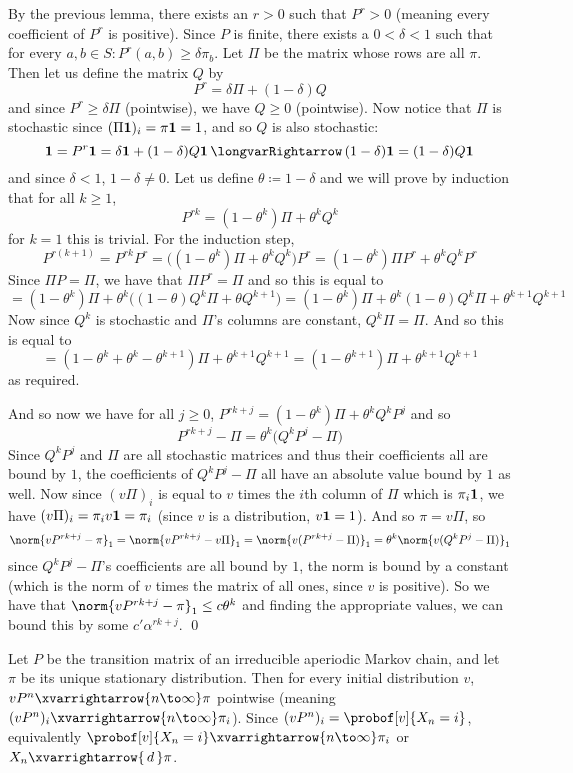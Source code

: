 \elemm

By the previous lemma, there exists an $r>0$ such that $P^r>0$ (meaning every coefficient of $P^r$ is positive).
Since $P$ is finite, there exists a $0<\delta<1$ such that for every $a,b\in S\colon P^r(a,b)\geq\delta\pi_b$.
Let $\Pi$ be the matrix whose rows are all $\pi$.
Then let us define the matrix $Q$ by
$$ P^r = \delta\Pi + (1-\delta)Q $$
and since $P^r\geq\delta\Pi$ (pointwise), we have $Q\geq0$ (pointwise).
Now notice that $\Pi$ is stochastic since $(\Pi{\bf1})_i=\pi{\bf1}=1$, and so $Q$ is also stochastic:
$$ {\bf1} = P^r{\bf1} = \delta{\bf1} + (1-\delta)Q{\bf1} \implies (1-\delta){\bf1} = (1-\delta)Q{\bf1} $$
and since $\delta<1$, $1-\delta\neq0$.
Let us define $\theta\coloneqq1-\delta$ and we will prove by induction that for all $k\geq1$,
$$ P^{rk} = (1-\theta^k)\Pi + \theta^kQ^k $$
for $k=1$ this is trivial.
For the induction step,
$$ P^{r(k+1)} = P^{rk}P^r = \bigl((1-\theta^k)\Pi + \theta^kQ^k\bigr)P^r = (1-\theta^k)\Pi P^r + \theta^kQ^kP^r $$
Since $\Pi P=\Pi$, we have that $\Pi P^r=\Pi$ and so this is equal to
$$ = (1-\theta^k)\Pi + \theta^k\bigl((1-\theta)Q^k\Pi + \theta Q^{k+1}\bigr) = (1-\theta^k)\Pi + \theta^k(1-\theta)Q^k\Pi + \theta^{k+1}Q^{k+1} $$
Now since $Q^k$ is stochastic and $\Pi$'s columns are constant, $Q^k\Pi=\Pi$.
And so this is equal to
$$ = (1-\theta^k+\theta^k-\theta^{k+1})\Pi + \theta^{k+1}Q^{k+1} = (1-\theta^{k+1})\Pi + \theta^{k+1}Q^{k+1} $$
as required.

And so now we have for all $j\geq0$, $P^{rk+j} = (1-\theta^k)\Pi + \theta^kQ^kP^j$ and so
$$ P^{rk+j} - \Pi = \theta^k\bigl(Q^kP^j - \Pi\bigr) $$
Since $Q^kP^j$ and $\Pi$ are all stochastic matrices and thus their coefficients all are bound by $1$, the coefficients of $Q^kP^j-\Pi$ all have an absolute value bound by $1$ as well.
Now since $(v\Pi)_i$ is equal to $v$ times the $i$th column of $\Pi$ which is $\pi_i{\bf1}$, we have $(v\Pi)_i=\pi_iv{\bf1}=\pi_i$ (since $v$ is a distribution, $v{\bf1}=1$).
And so $\pi=v\Pi$, so
$$ \norm{vP^{rk+j}-\pi}_1 = \norm{vP^{rk+j}-v\Pi}_1 = \norm{v(P^{rk+j}-\Pi)}_1 = \theta^k\norm{v(Q^kP^j-\Pi)}_1 $$
since $Q^kP^j-\Pi$'s coefficients are all bound by $1$, the norm is bound by a constant (which is the norm of $v$ times the matrix of all ones, since $v$ is positive).
So we have that $\norm{vP^{rk+j}-\pi}_1\leq c\theta^k$ and finding the appropriate values, we can bound this by some $c'\alpha^{rk+j}$.
\qed

\bthrm

    Let $P$ be the transition matrix of an irreducible aperiodic Markov chain, and let $\pi$ be its unique stationary distribution.
    Then for every initial distribution $v$, $vP^n\xvarrightarrow{n\to\infty}\pi$ pointwise (meaning $(vP^n)_i\xvarrightarrow{n\to\infty}\pi_i$).
    Since $(vP^n)_i=\probof[v]{X_n=i}$, equivalently $\probof[v]{X_n=i}\xvarrightarrow{n\to\infty}\pi_i$ or $X_n\xvarrightarrow{\,d\,}\pi$.

